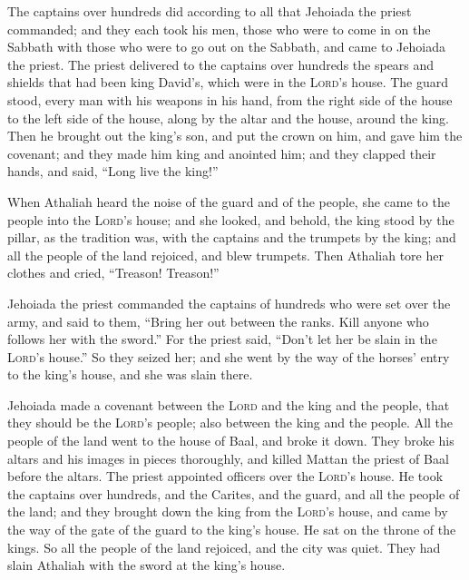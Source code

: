  The captains over hundreds did according to all that
Jehoiada the priest commanded; and they each took his men, those who
were to come in on the Sabbath with those who were to go out on the
Sabbath, and came to Jehoiada the priest.  The priest
delivered to the captains over hundreds the spears and shields that had
been king David's, which were in the \textsc{Lord}'s house.
 The guard stood, every man with his weapons in his hand,
from the right side of the house to the left side of the house, along by
the altar and the house, around the king.  Then he
brought out the king's son, and put the crown on him, and gave him the
covenant; and they made him king and anointed him; and they clapped
their hands, and said, ``Long live the king!''

 When Athaliah heard the noise of the guard and of the
people, she came to the people into the \textsc{Lord}'s house;
 and she looked, and behold, the king stood by the
pillar, as the tradition was, with the captains and the trumpets by the
king; and all the people of the land rejoiced, and blew trumpets. Then
Athaliah tore her clothes and cried, ``Treason! Treason!''

 Jehoiada the priest commanded the captains of hundreds
who were set over the army, and said to them, ``Bring her out between
the ranks. Kill anyone who follows her with the sword.'' For the priest
said, ``Don't let her be slain in the \textsc{Lord}'s house.''
 So they seized her; and she went by the way of the
horses' entry to the king's house, and she was slain there.

 Jehoiada made a covenant between the \textsc{Lord} and
the king and the people, that they should be the \textsc{Lord}'s people;
also between the king and the people.  All the people of
the land went to the house of Baal, and broke it down. They broke his
altars and his images in pieces thoroughly, and killed Mattan the priest
of Baal before the altars. The priest appointed officers over the
\textsc{Lord}'s house.  He took the captains over
hundreds, and the Carites, and the guard, and all the people of the
land; and they brought down the king from the \textsc{Lord}'s house, and
came by the way of the gate of the guard to the king's house. He sat on
the throne of the kings.  So all the people of the land
rejoiced, and the city was quiet. They had slain Athaliah with the sword
at the king's house.

